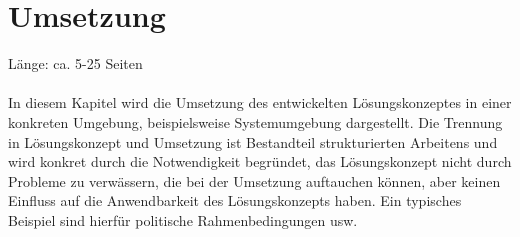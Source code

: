 \chapter{Umsetzung}
Länge: ca. 5-25 Seiten\\\\
In diesem Kapitel wird die Umsetzung des entwickelten Lösungskonzeptes in einer konkreten Umgebung, beispielsweise Systemumgebung dargestellt. Die Trennung in Lösungskonzept und Umsetzung ist Bestandteil strukturierten Arbeitens und wird konkret durch die Notwendigkeit begründet, das Lösungskonzept nicht durch Probleme zu verwässern, die bei der Umsetzung auftauchen können, aber keinen Einfluss auf die Anwendbarkeit des Lösungskonzepts haben. Ein typisches Beispiel sind hierfür politische Rahmenbedingungen usw. 
